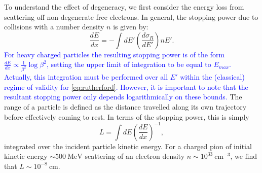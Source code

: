 \documentclass[11 pt, preprint,preprintnumbers,amsmath,amssymb, prd]{revtex4}
\begin{document}
To understand the effect of degeneracy, we first consider the energy loss from scattering off non-degenerate free electrons. In general, the stopping power due to collisions with a number density $n$ is given by:
\begin{equation}
\label{eq:SP}
\frac{dE}{dx} = - \int dE' \left(\frac{d \sigma_R}{dE'}\right) n E'.
\end{equation}
\textcolor{blue}{For heavy charged particles the resulting stopping power is of the form $\frac{dE}{dx} \propto \frac{1}{\beta^2} \log{\beta^2}$, setting the upper limit of integration to be equal to $E_{max}$. Actually, this integration must be performed over all $E'$ within the (classical) regime of validity for \eqref{eq:rutherford}. However, it is important to note that the resultant stopping power only depends logarithmically on these bounds.} The range of a particle is defined as the distance travelled along its own trajectory before effectively coming to rest. In terms of the stopping power, this is simply
\begin{equation}
L = \int dE \left(\frac{dE}{dx}\right)^{-1},
\end{equation}
integrated over the incident particle kinetic energy. For a charged pion of initial kinetic energy $\sim 500 ~\text{MeV}$ scattering of an electron density $n \sim 10^{33} ~\text{cm}^{-3}$, we find that $L \sim 10^{-8} ~\text{cm}$. 
\end{document}
